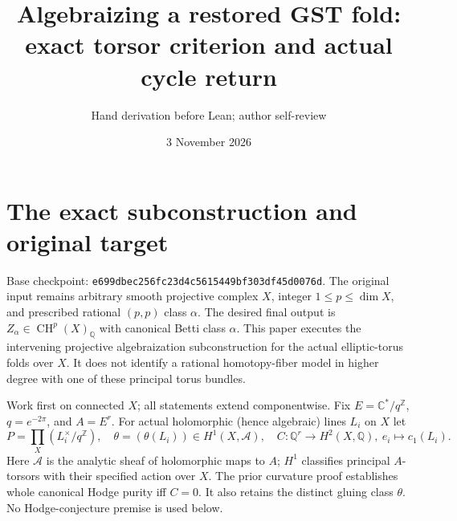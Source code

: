 \documentclass[11pt]{article}
\title{Algebraizing a restored GST fold: exact torsor criterion and actual cycle return}
\author{Hand derivation before Lean; author self-review}
\date{3 November 2026}
\newcommand{\Q}{\mathbb Q}
\newcommand{\Z}{\mathbb Z}
\newcommand{\C}{\mathbb C}
\newcommand{\CH}{\operatorname{CH}}
\begin{document}
\maketitle

\section{The exact subconstruction and original target}
Base checkpoint: \texttt{e699dbec256fc23d4c5615449bf303df45d0076d}.
The original input remains arbitrary smooth projective complex $X$, integer
$1\le p\le\dim X$, and prescribed rational $(p,p)$ class $\alpha$.
The desired final output is $Z_\alpha\in\CH^p(X)_\Q$ with canonical
Betti class $\alpha$. This paper executes the intervening projective
algebraization subconstruction for the actual elliptic-torus folds over $X$.
It does not identify a rational homotopy-fiber model in higher degree with
one of these principal torus bundles.

Work first on connected $X$; all statements extend componentwise. Fix
$E=\C^*/q^\Z$, $q=e^{-2\pi}$, and $A=E^r$. For actual holomorphic (hence
algebraic) lines $L_i$ on $X$ let
\[
 P=\prod_X (L_i^\times/q^\Z),\quad
 \theta=(\theta(L_i))\in H^1(X,\mathcal A),\quad
 C:\Q^r\to H^2(X,\Q),\ e_i\mapsto c_1(L_i).
\]
Here $\mathcal A$ is the analytic sheaf of holomorphic maps to $A$;
$H^1$ classifies principal $A$-torsors with their specified action over $X$.
The prior curvature proof establishes whole canonical Hodge purity iff
$C=0$. It also retains the distinct gluing class $\theta$.
No Hodge-conjecture premise is used below.
\end{document}

